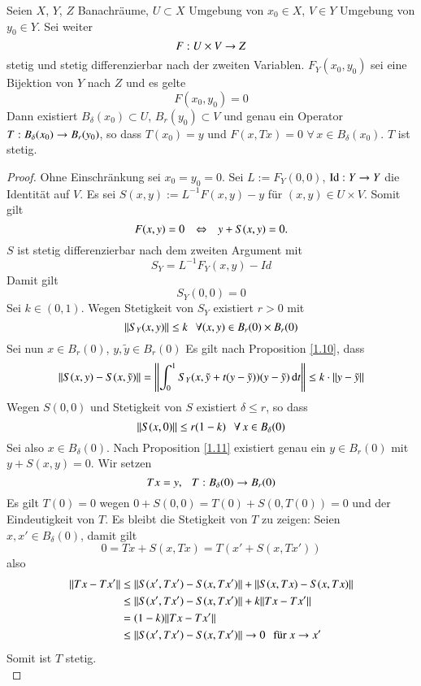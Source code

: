\begin{theorem}\label{1.12}
    Seien $X$, $Y$, $Z$ Banachräume, $U\subset X$ Umgebung von $x_0\in X$, $V\in Y$ Umgebung von 
    $y_0 \in Y$. Sei weiter
    \[F:U\times V\rightarrow Z\]
    stetig und stetig differenzierbar nach der zweiten Variablen. $F_Y(x_0,y_0)$ sei eine Bijektion
    von $Y$ nach $Z$ und es gelte
    \[
        F(x_0,y_0)=0
    \]
    Dann existiert $B_\delta(x_0)\subset U$, $B_r(y_0)\subset V$ und genau ein Operator 
    $T:B_\delta(x_0)\rightarrow B_r(y_0)$, so dass $T(x_0)=y$ und $F(x,Tx)=0$ $\forall \, x\in B_\delta(x_0)$.
    $T$ ist stetig.
\end{theorem}

\begin{proof}
    Ohne Einschränkung sei $x_0=y_0=0$. Sei $L:= F_Y(0,0)$, $\mathrm{Id}: Y\rightarrow Y$ die Identität auf $V$. Es 
    sei $S(x,y):= L^{-1}F(x,y)-y$ für $(x,y)\in U\times V$. Somit gilt
    \[
        F(x,y)=0 \hspace{.25cm} \Leftrightarrow \hspace{.25cm} y+S(x,y)=0.
    \]
    $S$ ist stetig differenzierbar nach dem zweiten Argument mit
    \[
        S_Y=L^{-1} F_Y(x,y)-Id
    \]
    Damit gilt
    \[
        S_Y(0,0)=0
    \]
    Sei $k\in (0,1)$. Wegen Stetigkeit von $S_Y$ existiert $r>0$ mit 
    \[
        \|S_Y(x,y)\|\leq k \hspace{.25cm} \forall (x,y)\in B_r(0)\times B_r(0)
    \]
    Sei nun $x\in B_r(0)$, $y, \tilde y \in B_r(0)$
    Es gilt nach Proposition \ref{1.10}, dass
    \[
        \|S(x,y)-S(x,\tilde y)\|=\left\|\int_0^1 S_Y(x,\tilde y +t(y-\tilde y)) (y-\tilde y) \, \mathrm{d} t 
        \right\|\leq k\cdot\|y-\tilde y\|
    \]
    Wegen $S(0,0)$ und Stetigkeit von $S$ existiert $\delta \leq r$, so dass
    \[
        \|S(x,0)\|\leq r(1-k) \hspace{.25cm} \forall \, x \in B_\delta (0)
    \]
    Sei also $x\in B_\delta(0)$. Nach Proposition \ref{1.11} existiert genau ein $y\in B_r(0)$ mit
    $y+S(x,y)=0$. Wir setzen
    \[
        Tx=y, \hspace{.25cm} T:B_\delta(0)\rightarrow B_r(0)
    \]
    Es gilt $T(0)=0$ wegen $0+S(0,0)=T(0)+S(0,T(0))=0$ und der Eindeutigkeit von $T$. Es bleibt die
    Stetigkeit von $T$ zu zeigen: Seien $x,x'\in B_\delta (0)$, damit gilt
    \[
        0=Tx+S(x,Tx)=T(x'+S(x,Tx'))
    \]
    also
    \begin{align*}
        \|Tx-Tx'\|&\leq \|S(x',Tx')-S(x,Tx')\|+\|S(x,Tx)-S(x,Tx)\|\\
            &\leq \|S(x',Tx') - S(x,Tx')\|+k\|Tx-Tx'\|\\
            &= (1-k)\|Tx-Tx'\|\\
            &\leq \|S(x',Tx')-S(x,Tx')\| \rightarrow 0 \hspace{.25cm} \text{für $x\rightarrow x'$} 
    \end{align*}
    Somit ist $T$ stetig.
    \[\]
\end{proof}

